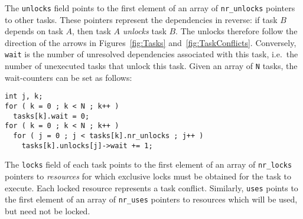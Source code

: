 \documentclass[preprint]{elsarticle}
\newcommand{\figs}[2]
    {Figures~\ref{fig:#1} and~\ref{fig:#2}}
\begin{document}
The {\tt unlocks} field points to the first element of
an array of {\tt nr\_unlocks} pointers to other tasks.
These pointers represent the dependencies in reverse:
if task $B$ depends on task $A$, then task $A$ {\em unlocks}
task $B$.
The unlocks therefore follow the direction of the arrows
in \figs{Tasks}{TaskConflicts}.
Conversely, {\tt wait} is the number of unresolved dependencies
associated with this task, i.e.~the number of unexecuted tasks
that unlock this task.
Given an array of {\tt N} tasks, the wait-counters can
be set as follows:
\begin{center}\begin{minipage}{0.9\textwidth}
    \begin{lstlisting}
int j, k;
for ( k = 0 ; k < N ; k++ )
  tasks[k].wait = 0;
for ( k = 0 ; k < N ; k++ )
  for ( j = 0 ; j < tasks[k].nr_unlocks ; j++ )
    tasks[k].unlocks[j]->wait += 1;
    \end{lstlisting}
\end{minipage}\end{center}

The {\tt locks} field of each task points to the first element of
an array of {\tt nr\_locks} pointers to {\em resources}
for which exclusive locks must be obtained for the task
to execute.
Each locked resource represents a task conflict.
Similarly, {\tt uses} points to the first element of
an array of {\tt nr\_uses} pointers to resources which
will be used, but need not be locked.
\end{document}
